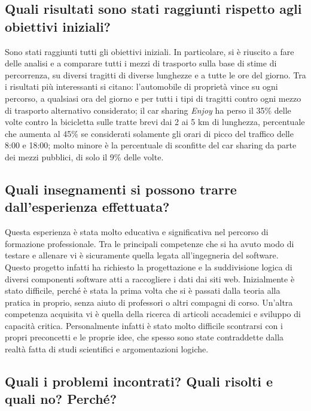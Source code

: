 \documentclass[a4paper,11pt]{article}
\begin{document}
\subsection{Quali risultati sono stati raggiunti rispetto agli obiettivi iniziali?}

Sono stati raggiunti tutti gli obiettivi iniziali. In particolare, si è riuscito a fare delle analisi e a comparare tutti i mezzi di trasporto sulla base di stime di percorrenza, su diversi tragitti di diverse lunghezze e a tutte le ore del giorno. Tra i risultati più interessanti si citano: l'automobile di proprietà vince su ogni percorso, a qualsiasi ora del giorno e per tutti i tipi di tragitti contro ogni mezzo di trasporto alternativo considerato; il car sharing \textit{Enjoy} ha perso il 35\% delle volte contro la bicicletta sulle tratte brevi dai 2 ai 5 km di lunghezza, percentuale che aumenta al 45\% se considerati solamente gli orari di picco del traffico delle 8:00 e 18:00; molto minore è la percentuale di sconfitte del car sharing da parte dei mezzi pubblici, di solo il 9\% delle volte.

\subsection{Quali insegnamenti si possono trarre dall'esperienza effettuata?}

Questa esperienza è stata molto educativa e significativa nel percorso di formazione professionale. Tra le principali competenze che si ha avuto modo di testare e allenare vi è sicuramente quella legata all'ingegneria del software. Questo progetto infatti ha richiesto la progettazione e la suddivisione logica di diversi componenti software atti a raccogliere i dati dai siti web. Inizialmente è stato difficile, perché è stata la prima volta che si è passati dalla teoria alla pratica in proprio, senza aiuto di professori o altri compagni di corso. Un'altra competenza acquisita vi è quella della ricerca di articoli accademici e sviluppo di capacità critica. Personalmente infatti è stato molto difficile scontrarsi con i propri preconcetti e le proprie idee, che spesso sono state contraddette dalla realtà fatta di studi scientifici e argomentazioni logiche.

\subsection{Quali i problemi incontrati? Quali risolti e quali no? Perché?}
\end{document}
